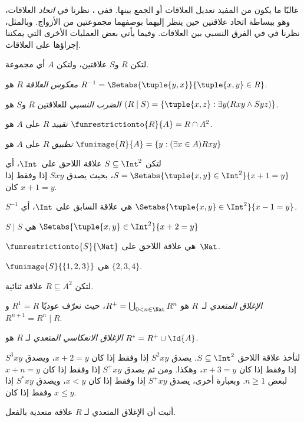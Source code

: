 \documentclass[../../../include/open-logic-section]{subfiles}
\begin{document}

غالبًا ما يكون من المفيد تعديل العلاقات أو الجمع بينها. ففي
، نظرنا في \emph{اتحاد}
العلاقات، وهو ببساطة اتحاد علاقتين حين ينظر إليهما بوصفهما
مجموعتين من الأزواج. وبالمثل، نظرنا في 
في الفرق النسبي بين العلاقات. وفيما يأتي بعض
العمليات الأخرى التي يمكننا إجراؤها على العلاقات.

\begin{defn}
لتكن $R$ و$S$ علاقتين، ولتكن $A$ أي مجموعة.

\emph{معكوس العلاقة} $R$ هو $R^{-1} = \Setabs{\tuple{y, x}}{\tuple{x,
    y} \in R}$.

\emph{الضرب النسبي} للعلاقتين $R$ و$S$ هو $(R \mid S) =
\{\tuple{x, z} : \exists y(Rxy \land Syz)\}$.

\emph{تقييد} $R$ على $A$ هو $\funrestrictionto{R}{A}= R
\cap A^2$.

\emph{تطبيق} $R$ على $A$ هو $\funimage{R}{A} = \{y :
(\exists x \in A)Rxy\}$
\end{defn}

\begin{ex}
لتكن $S \subseteq \Int^2$ علاقة اللاحق على~$\Int$، أي
$S = \Setabs{\tuple{x, y} \in \Int^2}{x + 1 = y}$، بحيث يصدق $Sxy$ إذا وفقط إذا كان $x + 1 = y$.

$S^{-1}$ هي علاقة السابق على $\Int$، أي
$\Setabs{\tuple{x,y}\in\Int^2}{x -1 =y}$.

$S\mid S$ هي
$ \Setabs{\tuple{x,y}\in\Int^2}{x + 2 =y}$

$\funrestrictionto{S}{\Nat}$ هي علاقة اللاحق على~$\Nat$.

$\funimage{S}{\{1,2,3\}}$ هي $\{2, 3, 4\}$.
\end{ex}

\begin{defn}لتكن $R \subseteq A^2$ علاقة ثنائية.

\emph{الإغلاق المتعدي} لـ~$R$ هو $R^+ = \bigcup_{0 < n \in
\Nat} R^n$، حيث نعرّف عوديًا $R^1 = R$ و$R^{n+1} = R^n
\mid R$.

\emph{الإغلاق الانعكاسي المتعدي} لـ $R$ هو $R^* = R^+ \cup
\Id{A}$.
\end{defn}

\begin{ex}
لنأخذ علاقة اللاحق $S \subseteq \Int^2$. يصدق $S^2xy$ إذا وفقط إذا كان $x + 2 =
y$، ويصدق $S^3xy$ إذا وفقط إذا كان $x + 3 = y$، وهكذا. ومن ثم يصدق $S^+xy$ إذا وفقط إذا كان $x + n = y$ لبعض
$n \geq 1$. وبعبارة أخرى، يصدق $S^+xy$ إذا وفقط إذا كان $x < y$، ويصدق $S^*xy$ إذا وفقط إذا كان $x \le
y$.
\end{ex}

\begin{prob}
أثبت أن الإغلاق المتعدي لـ $R$ علاقة متعدية بالفعل.
\end{prob}
\end{document}
